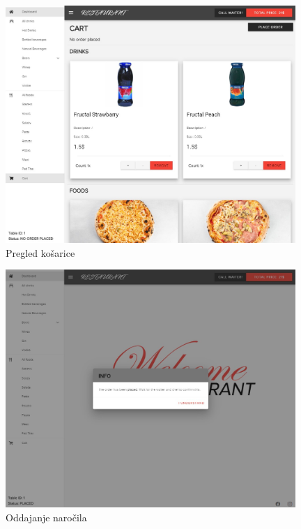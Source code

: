 \documentclass[a4paper, 12pt]{book}
\begin{document}
\begin{figure}
\centering
\includegraphics[width=11cm]{order_2.jpg}
\caption{Pregled košarice}
\label{Opis2}
\end{figure}
\begin{figure}
\centering
\includegraphics[width=11cm]{order_3.jpg}
\caption{Oddajanje naročila}
\label{Opis22}
\end{figure}
\end{document}
